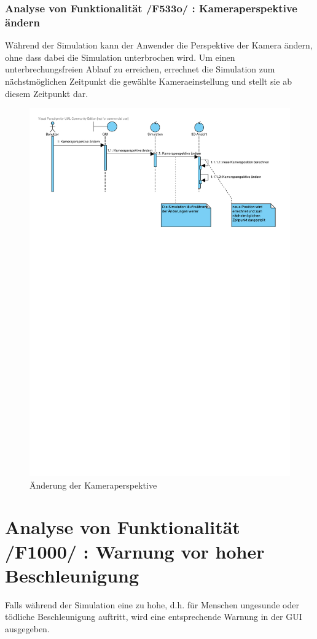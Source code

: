 \newpage

\subsubsection{Analyse von Funktionalität /F533o/ :  Kameraperspektive ändern}
Während der Simulation kann der Anwender die Perspektive der Kamera ändern, ohne dass dabei die Simulation unterbrochen wird. Um einen unterbrechungsfreien Ablauf zu erreichen, errechnet die Simulation zum nächstmöglichen Zeitpunkt die gewählte Kameraeinstellung und stellt sie ab diesem Zeitpunkt dar. 
\begin{figure}[h!]
\includegraphics[viewport = 0 17.5cm 25cm 30cm,width=\linewidth]{bilder/Kameraperspektive.pdf}
\caption{Änderung der Kameraperspektive}
\label{Kameraperspektive}
\end{figure}
\section{Analyse von Funktionalität /F1000/ :  Warnung vor hoher Beschleunigung}
Falls während der Simulation eine zu hohe, d.h. für Menschen ungesunde oder tödliche Beschleunigung auftritt, wird eine entsprechende Warnung in der GUI ausgegeben.

